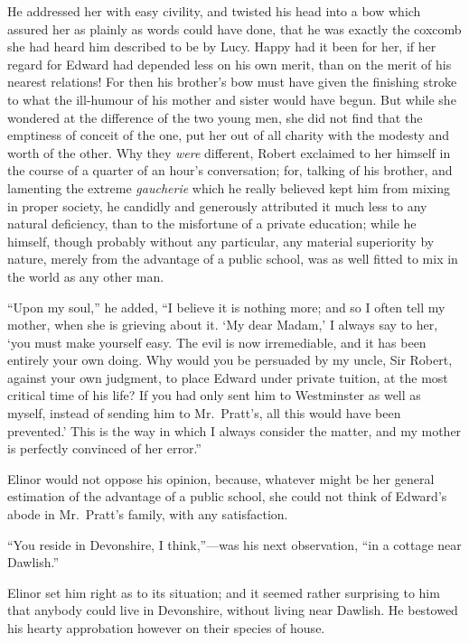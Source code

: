 He addressed her with easy civility, and twisted
his head into a bow which assured her as plainly as
words could have done, that he was exactly the coxcomb
she had heard him described to be by Lucy.  Happy had
it been for her, if her regard for Edward had depended
less on his own merit, than on the merit of his nearest
relations!  For then his brother's bow must have given
the finishing stroke to what the ill-humour of his mother
and sister would have begun.  But while she wondered
at the difference of the two young men, she did not find
that the emptiness of conceit of the one, put her out
of all charity with the modesty and worth of the other.
Why they \emph{were} different, Robert exclaimed to her himself
in the course of a quarter of an hour's conversation;
for, talking of his brother, and lamenting the extreme
\emph{gaucherie} which he really believed kept him from mixing
in proper society, he candidly and generously attributed it
much less to any natural deficiency, than to the misfortune
of a private education; while he himself, though probably
without any particular, any material superiority
by nature, merely from the advantage of a public school,
was as well fitted to mix in the world as any other man.

``Upon my soul,'' he added, ``I believe it is nothing more;
and so I often tell my mother, when she is grieving
about it.  `My dear Madam,' I always say to her, `you must
make yourself easy.  The evil is now irremediable,
and it has been entirely your own doing.  Why would
you be persuaded by my uncle, Sir Robert, against your
own judgment, to place Edward under private tuition,
at the most critical time of his life?  If you had only sent
him to Westminster as well as myself, instead of sending
him to Mr.\ Pratt's, all this would have been prevented.'
This is the way in which I always consider the matter,
and my mother is perfectly convinced of her error.''

Elinor would not oppose his opinion, because,
whatever might be her general estimation of the advantage
of a public school, she could not think of Edward's
abode in Mr.\ Pratt's family, with any satisfaction.

``You reside in Devonshire, I think,''---was his
next observation, ``in a cottage near Dawlish.''

Elinor set him right as to its situation;
and it seemed rather surprising to him that anybody
could live in Devonshire, without living near Dawlish.
He bestowed his hearty approbation however on their
species of house.

